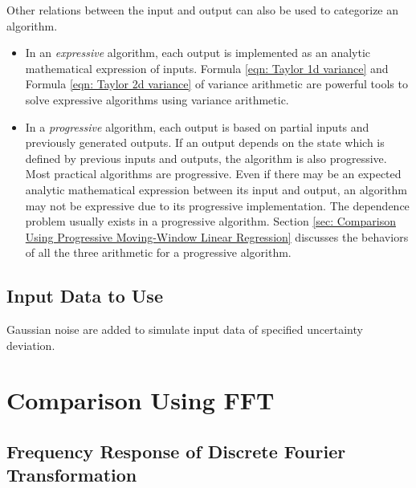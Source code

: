 \documentclass[twoside]{article}
\numberwithin{equation}{section}
\begin{document}
Other relations between the input and output can also be used to categorize an algorithm.  
\begin{itemize}
\item  In an \emph{expressive} algorithm, each output is implemented as an analytic mathematical expression of inputs.  
Formula \eqref{eqn: Taylor 1d variance} and Formula \eqref{eqn: Taylor 2d variance} of variance arithmetic are powerful tools to solve expressive algorithms using variance arithmetic.  

\item  In a \emph{progressive} algorithm, each output is based on partial inputs and previously generated outputs.  
If an output depends on the state which is defined by previous inputs and outputs, the algorithm is also progressive.  
Most practical algorithms are progressive.  
Even if there may be an expected analytic mathematical expression between its input and output, an algorithm may not be expressive due to its progressive implementation.  
The dependence problem usually exists in a progressive algorithm.  
Section \ref{sec: Comparison Using Progressive Moving-Window Linear Regression} discusses the behaviors of all the three arithmetic for a progressive algorithm.
\end{itemize}


\subsection{Input Data to Use}

Gaussian noise are added to simulate input data of specified uncertainty deviation.



\clearpage
\section{ Comparison Using FFT}
\label{sec: FFT}


\subsection{Frequency Response of Discrete Fourier Transformation}
\end{document}
